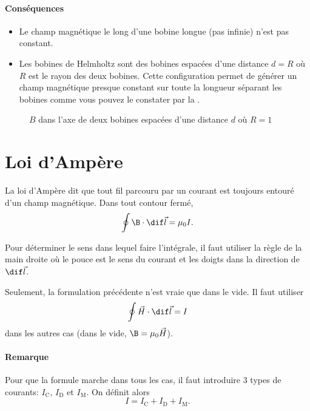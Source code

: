 \paragraph{Conséquences}
\begin{itemize}
  \item Le champ magnétique le long d'une bobine longue
    (pas infinie) n'est pas constant.
  \item Les bobines de Helmholtz sont des bobines espacées
    d'une distance $d = R$ où $R$ est le rayon des deux bobines.
    Cette configuration permet de générer un champ magnétique presque constant
    sur toute la longueur séparant les bobines
    comme vous pouvez le constater par la .
\end{itemize}
\begin{figure}
  \begin{center}
  \end{center}
  \caption{$B$ dans l'axe de deux bobines espacées d'une distance $d$ où $R=1$}
  \label{fig:deqr}
\end{figure}

\section{Loi d'Ampère}
La loi d'Ampère dit que tout fil parcouru par un courant
est toujours entouré d'un champ magnétique.
Dans tout contour fermé,
\[ \oint \B \cdot \dif \vec l = \mu_0 I. \]

Pour déterminer le sens dans lequel faire l'intégrale,
il faut utiliser la règle de la main droite
où le pouce est le sens du courant
et les doigts dans la direction de $\dif\vec l$.

Seulement, la formulation précédente n'est vraie que dans le vide.
Il faut utiliser
\[ \oint \vec H \cdot \dif \vec l = I \]
dans les autres cas (dans le vide, $\B = \mu_0 \vec H$).

\paragraph{Remarque}
Pour que la formule marche dans tous les cas,
il faut introduire 3 types de courants:
$I_\mathrm{C}$, $I_\mathrm{D}$ et $I_\mathrm{M}$.
On définit alors
\[ I = I_\mathrm{C} + I_\mathrm{D} + I_\mathrm{M}. \]

